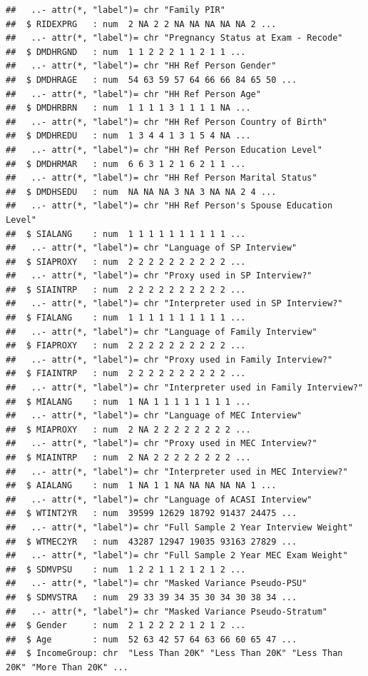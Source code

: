 \documentclass[
]{book}
\theoremstyle{definition}
\theoremstyle{definition}
\theoremstyle{definition}
\theoremstyle{remark}
\begin{document}
\begin{verbatim}
##   ..- attr(*, "label")= chr "Family PIR"
##  $ RIDEXPRG   : num  2 NA 2 2 NA NA NA NA NA 2 ...
##   ..- attr(*, "label")= chr "Pregnancy Status at Exam - Recode"
##  $ DMDHRGND   : num  1 1 2 2 2 1 1 2 1 1 ...
##   ..- attr(*, "label")= chr "HH Ref Person Gender"
##  $ DMDHRAGE   : num  54 63 59 57 64 66 66 84 65 50 ...
##   ..- attr(*, "label")= chr "HH Ref Person Age"
##  $ DMDHRBRN   : num  1 1 1 1 3 1 1 1 1 NA ...
##   ..- attr(*, "label")= chr "HH Ref Person Country of Birth"
##  $ DMDHREDU   : num  1 3 4 4 1 3 1 5 4 NA ...
##   ..- attr(*, "label")= chr "HH Ref Person Education Level"
##  $ DMDHRMAR   : num  6 6 3 1 2 1 6 2 1 1 ...
##   ..- attr(*, "label")= chr "HH Ref Person Marital Status"
##  $ DMDHSEDU   : num  NA NA NA 3 NA 3 NA NA 2 4 ...
##   ..- attr(*, "label")= chr "HH Ref Person's Spouse Education Level"
##  $ SIALANG    : num  1 1 1 1 1 1 1 1 1 1 ...
##   ..- attr(*, "label")= chr "Language of SP Interview"
##  $ SIAPROXY   : num  2 2 2 2 2 2 2 2 2 2 ...
##   ..- attr(*, "label")= chr "Proxy used in SP Interview?"
##  $ SIAINTRP   : num  2 2 2 2 2 2 2 2 2 2 ...
##   ..- attr(*, "label")= chr "Interpreter used in SP Interview?"
##  $ FIALANG    : num  1 1 1 1 1 1 1 1 1 1 ...
##   ..- attr(*, "label")= chr "Language of Family Interview"
##  $ FIAPROXY   : num  2 2 2 2 2 2 2 2 2 2 ...
##   ..- attr(*, "label")= chr "Proxy used in Family Interview?"
##  $ FIAINTRP   : num  2 2 2 2 2 2 2 2 2 2 ...
##   ..- attr(*, "label")= chr "Interpreter used in Family Interview?"
##  $ MIALANG    : num  1 NA 1 1 1 1 1 1 1 1 ...
##   ..- attr(*, "label")= chr "Language of MEC Interview"
##  $ MIAPROXY   : num  2 NA 2 2 2 2 2 2 2 2 ...
##   ..- attr(*, "label")= chr "Proxy used in MEC Interview?"
##  $ MIAINTRP   : num  2 NA 2 2 2 2 2 2 2 2 ...
##   ..- attr(*, "label")= chr "Interpreter used in MEC Interview?"
##  $ AIALANG    : num  1 NA 1 1 NA NA NA NA NA 1 ...
##   ..- attr(*, "label")= chr "Language of ACASI Interview"
##  $ WTINT2YR   : num  39599 12629 18792 91437 24475 ...
##   ..- attr(*, "label")= chr "Full Sample 2 Year Interview Weight"
##  $ WTMEC2YR   : num  43287 12947 19035 93163 27829 ...
##   ..- attr(*, "label")= chr "Full Sample 2 Year MEC Exam Weight"
##  $ SDMVPSU    : num  1 2 2 1 1 2 1 2 1 2 ...
##   ..- attr(*, "label")= chr "Masked Variance Pseudo-PSU"
##  $ SDMVSTRA   : num  29 33 39 34 35 30 34 30 38 34 ...
##   ..- attr(*, "label")= chr "Masked Variance Pseudo-Stratum"
##  $ Gender     : num  2 1 2 2 2 2 1 2 1 2 ...
##  $ Age        : num  52 63 42 57 64 63 66 60 65 47 ...
##  $ IncomeGroup: chr  "Less Than 20K" "Less Than 20K" "Less Than 20K" "More Than 20K" ...

\end{verbatim}
\end{document}
